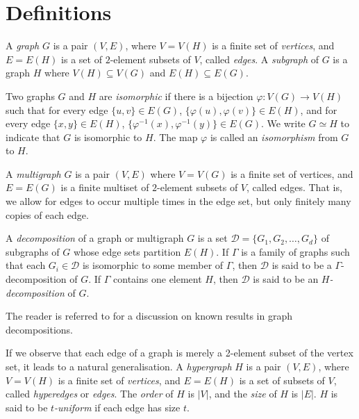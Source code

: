 \section{Definitions}


A {\em graph} $G$ is a pair $(V, E)$, where $V = V(H)$ is a finite set of {\em vertices}, and $E = E(H)$ is a set of $2$-element subsets of $V$, called {\em edges}.
A {\em subgraph} of $G$ is a graph $H$ where $V(H) \subseteq V(G)$ and $E(H) \subseteq E(G)$.

Two graphs $G$ and $H$ are {\em isomorphic} if there is a bijection $\varphi : V(G) \to V(H)$ such that for every edge $\{u, v\} \in E(G)$, $\{\varphi(u), \varphi(v)\} \in E(H)$, and for every edge $\{x, y\} \in E(H)$, $\{\varphi^{-1}(x), \varphi^{-1}(y)\} \in E(G)$.
We write $G \simeq H$ to indicate that $G$ is isomorphic to $H$.
The map $\varphi$ is called an {\em isomorphism} from $G$ to $H$.


A {\em multigraph} $G$ is a pair $(V, E)$ where $V = V(G)$ is a finite set of vertices, and $E = E(G)$ is a finite multiset of $2$-element subsets of $V$, called edges. That is, we allow for edges to occur multiple times in the
edge set, but only finitely many copies of each edge.

A {\em decomposition} of a graph or multigraph $G$ is a set $\mathcal{D} = \{G_1, G_2, \ldots, G_d\}$ of
subgraphs of $G$ whose edge sets partition $E(H)$.
If $\Gamma$ is a family of graphs such that each $G_i \in \mathcal{D}$ is isomorphic to some
member of $\Gamma$, then $\mathcal{D}$ is said to be a $\Gamma$-decomposition of $G$.
If $\Gamma$ contains one element $H$, then $\mathcal{D}$ is said to be an
{\em $H$-decomposition} of $G$.

The reader is referred to \cite{bryant-graph} for a discussion on known results
in graph decompositions.

If we observe that each edge of a graph is merely a 2-element subset of the
vertex set, it leads to a natural generalisation.
A {\em hypergraph} $H$ is a pair $(V, E)$, where $V = V(H)$ is a finite set of
{\em vertices}, and $E = E(H)$ is a set of subsets of $V$, called {\em
hyperedges} or {\em edges}.
The {\em order} of $H$ is $|V|$, and the {\em size} of $H$ is $|E|$.
$H$ is said to be {\em $t$-uniform} if each edge has size $t$.

